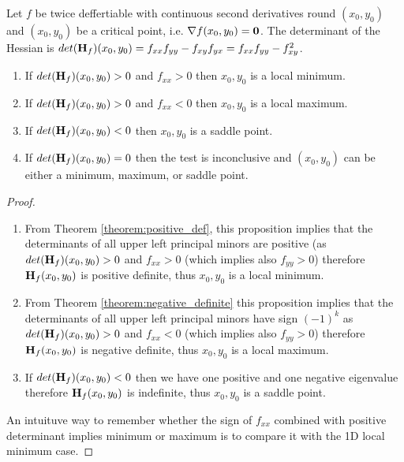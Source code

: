 \documentclass[a4paper]{article}
\numberwithin{equation}{section} %
\newcommand{\B}[1]{\textbf{\textup{#1}}} %
\begin{document}
\begin{corollary}
Let $f$ be twice deffertiable with continuous second derivatives round $(x_0,y_0)$ and $(x_0,y_0)$ be a critical point, i.e. $\nabla f(x_0,y_0)=\B{0}$. The determinant of the Hessian is $det(\B{H}_f)(x_0,y_0) = f_{xx}f_{yy} - f_{xy}f_{yx} = f_{xx}f_{yy} - f_{xy}^2$.
\begin{enumerate}
\item If $det(\B{H}_f)(x_0,y_0) > 0$ and $f_{xx}>0$ then $x_0,y_0$ is a local minimum.
\item If $det(\B{H}_f)(x_0,y_0) > 0$ and $f_{xx}<0$ then $x_0,y_0$ is a local maximum.
\item If $det(\B{H}_f)(x_0,y_0) < 0$  then $x_0,y_0$ is a saddle point.
\item If $det(\B{H}_f)(x_0,y_0) = 0$  then the test is inconclusive and $(x_0,y_0)$ can be either a minimum, maximum, or saddle point.
\end{enumerate}
\end{corollary}
\begin{proof} \quad \\
\begin{enumerate}
\item From Theorem \ref{theorem:positive_def}, this proposition implies that the determinants of all upper left principal minors are positive (as $det(\B{H}_f)(x_0,y_0) > 0$ and $f_{xx}>0$ (which implies also $f_{yy}>0$) therefore $\B{H}_f(x_0,y_0)$ is positive definite, thus $x_0,y_0$ is a local minimum.
\item From Theorem \ref{theorem:negative_definite} this proposition implies that the determinants of all upper left principal minors have sign $(-1)^k$  as $det(\B{H}_f)(x_0,y_0) > 0$ and $f_{xx}<0$  (which implies also $f_{yy}>0$) therefore $\B{H}_f(x_0,y_0)$ is negative definite, thus $x_0,y_0$ is a local maximum.
\item If $det(\B{H}_f)(x_0,y_0) < 0$ then we have one positive and one negative eigenvalue therefore $\B{H}_f(x_0,y_0)$ is indefinite, thus $x_0,y_0$ is a saddle point.  
\end{enumerate}
An intuituve way to remember whether the sign of $f_{xx}$ combined with positive determinant implies minimum or maximum is to compare it with the 1D local minimum case.
\end{proof}
\end{document}
